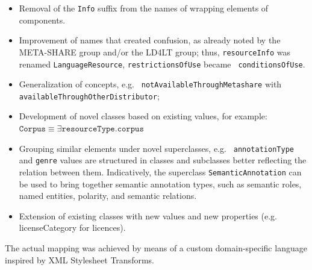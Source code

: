 \documentclass{llncs}
\begin{document}
\begin{itemize}
    \item Removal of the {\tt Info} suffix from the names of  wrapping elements of
        components.
    \item Improvement of names that created confusion, as already noted by the
        META-SHARE group and/or the LD4LT group; thus, {\tt resourceInfo} was renamed
        {\tt LanguageResource}, {\tt restrictionsOfUse} became {\tt
        conditionsOfUse}.
    \item Generalization of concepts, e.g. {\tt
        not\-Available\-Through\-Metashare} with {\tt
        avai\-lable\-Through\-Other\-Distributor};
\item Development of novel classes based on existing values, for example:
    \\$\mathtt{Corpus} \equiv \exists \mathtt{resourceType}.\mathtt{corpus}$
\item Grouping similar elements under novel superclasses, e.g. {\tt
    annotationType} and {\tt genre} values are structured in classes and
    subclasses better reflecting the relation between them. Indicatively, the superclass
    {\tt SemanticAnnotation} can be used to bring together semantic annotation types,
    such as semantic roles, named entities, polarity, and semantic relations.
\item Extension of existing classes with new values and new properties
    (e.g. licenseCategory for licences).
\end{itemize}

The actual mapping was achieved by means of a custom domain-specific language
inspired by XML Stylesheet Transforms.
\end{document}
